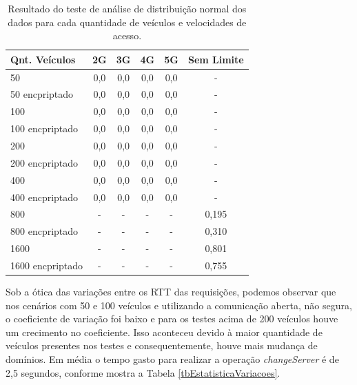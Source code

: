 \documentclass[
	12pt,				%
	oneside,			%
	a4paper,			%
	english,			%
	brazil				%
	]{abntex2ppgsi}
\begin{document}
\begin{table}[!h]
	\centering
	\caption{Resultado do teste de análise de distribuição normal dos dados para cada quantidade de veículos e velocidades de acesso. }
	\label{tbEstatisticaKS}
	\begin{tabular}{|l|c|c|c|c|c|}
		\hline
		\rowcolor[gray]{0.7}
		Qnt. Veículos & 2G  & 3G  & 4G  & 5G & Sem Limite  \\ \hline
		\cellcolor[gray]{0.7}50              & 0,0 & 0,0 & 0,0 & 0,0& - \\ \hline
		\cellcolor[gray]{0.7}50 encpriptado             & 0,0 & 0,0 & 0,0 & 0,0& - \\ \hline
		\cellcolor[gray]{0.7}100             & 0,0 & 0,0 & 0,0 & 0,0& - \\ \hline
		\cellcolor[gray]{0.7}100 encpriptado            & 0,0 & 0,0 & 0,0 & 0,0& - \\ \hline
		\cellcolor[gray]{0.7}200             & 0,0 & 0,0 & 0,0 & 0,0& - \\ \hline
		\cellcolor[gray]{0.7}200 encpriptado            & 0,0 & 0,0 & 0,0 & 0,0& - \\ \hline
		\cellcolor[gray]{0.7}400             & 0,0 & 0,0 & 0,0 & 0,0& - \\ \hline
		\cellcolor[gray]{0.7}400 encpriptado            & 0,0 & 0,0 & 0,0 & 0,0& - \\ \hline
		\cellcolor[gray]{0.7}800             & - & - & - & - & 0,195 \\ \hline
		\cellcolor[gray]{0.7}800 encpriptado             & - & - & - & - & 0,310\\ \hline
		\cellcolor[gray]{0.7}1600            & - & - & - & -& 0,801 \\ \hline
		\cellcolor[gray]{0.7}1600 encpriptado            & - & - & - & -& 0,755 \\ \hline
	\end{tabular}
\end{table}

Sob a ótica das variações entre os RTT das requisições, podemos observar que nos cenários com 50 e 100 veículos e utilizando a comunicação aberta, não segura, o coeficiente de variação foi baixo e para os testes acima de 200 veículos houve um crecimento no coeficiente. Isso aconteceu devido à maior quantidade de veículos presentes nos testes e consequentemente, houve mais mudança de domínios. Em média o tempo gasto para realizar a operação \textit{changeServer} é de 2,5 segundos, conforme mostra a Tabela \ref{tbEstatisticaVariacoes}.
\end{document}
